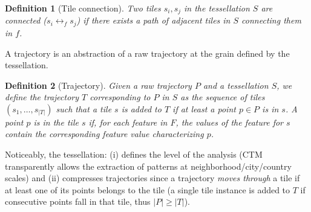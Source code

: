 \documentclass[
]{ceurart}
\newtheorem{definition}{Definition}
\begin{document}
\begin{definition}[Tile connection]\label{def:adj} 
Two tiles $s_i,s_j$ in the tessellation $S$ are  \textit{connected} ($s_i \leftrightarrow_{f} s_j$) if there exists a path of adjacent tiles in $S$ connecting them in $f$.
\end{definition}

A trajectory is an abstraction of a raw trajectory at the grain defined by the tessellation.

\begin{definition}[Trajectory] 
\label{def:tes}
Given a raw trajectory $P$ and a tessellation $S$, we define the \textit{trajectory} $T$ corresponding to $P$ in $S$ as the sequence of tiles $(s_{1}, \ldots, s_{|T|})$ such that a tile $s$ is added to $T$ if at least a point $p \in P$ is in $s$.
A point $p$ \textit{is in} the tile $s$ if, for each feature in $F$, the values of the feature for $s$ contain the corresponding feature value characterizing $p$.
\end{definition}

Noticeably, the tessellation:
(i) defines the level of the analysis (CTM transparently allows the extraction of patterns at neighborhood/city/country scales) 
and (ii) compresses trajectories since a trajectory \textit{moves through} a tile if at least one of its points belongs to the tile (a single tile instance is added to $T$ if consecutive points fall in that tile, thus $|P| \geq |T|$).
\end{document}
